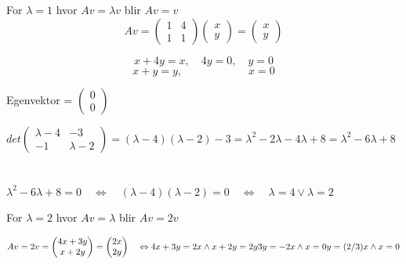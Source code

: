 \documentclass{article}
\begin{document}
For $\lambda = 1$ hvor $Av = \lambda v$ blir $Av = v$\\
\[Av = \begin{pmatrix}
    1 & 4 \\ 1 & 1
\end{pmatrix} \begin{pmatrix}
    x \\ y
\end{pmatrix} = \begin{pmatrix}
    x \\ y
\end{pmatrix}\]

\[x + 4y = x, \quad 4y = 0, \quad y = 0\]
\[x + y = y, \quad \quad \quad \quad \quad \quad x = 0\]

Egenvektor = $\begin{pmatrix}
    0 \\ 0
\end{pmatrix}$
 
\( det\begin{pmatrix}
    \lambda - 4 & - 3 \\ -1 & \lambda - 2
\end{pmatrix} = (\lambda - 4)(\lambda - 2) - 3 = \lambda^2 -2\lambda -4\lambda +8 = \lambda^2 -6\lambda + 8\) \\ \\  \\
\(\lambda^2 -6\lambda + 8 = 0 \quad \Leftrightarrow \quad (\lambda-4)(\lambda-2) = 0 \quad \Leftrightarrow \quad \lambda = 4 \vee \lambda = 2\)

For $\lambda = 2$ hvor $Av = \lambda$ blir $Av = 2v$

$Av = 2v = \begin{pmatrix}
    4x + 3y \\ x +2y
\end{pmatrix}
=
\begin{pmatrix}
        2x \\ 2y
\end{pmatrix}
\quad \Leftrightarrow 
4x+3y = 2x \wedge x+2y = 2y \\ \\
3y = -2x \wedge x = 0 \\ \\
y = (2/3)x \wedge x = 0
$
\end{document}

